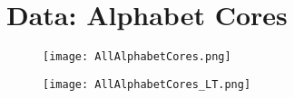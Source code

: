 \documentclass[../../CompleteThesis/Complete_1stDraft.tex]{subfiles}
\begin{document}
\section[Appendix II]{Data: Alphabet Cores}
\label{App:Data_Alphabet}
\begin{figure}[h]
	\centering
	\texttt{[image: AllAlphabetCores.png]}
	\caption[]{}
	\label{fig:AllAlphabetCores}
\end{figure}

\begin{figure}[h]
	\centering
	\texttt{[image: AllAlphabetCores\_LT.png]}
	\caption[]{}
	\label{fig:AllAlphabetCores_LT}
\end{figure}
\end{document}
